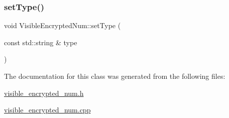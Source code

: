 \mbox{\label{class_visible_encrypted_num_abca1e8c379a3eba175937c7152ba298e}} 
\subsubsection{\texorpdfstring{set\+Type()}{setType()}}
{\footnotesize\ttfamily void Visible\+Encrypted\+Num\+::set\+Type (\begin{DoxyParamCaption}\item[{const std\+::string \&}]{type }\end{DoxyParamCaption})\hspace{0.3cm}{\ttfamily [virtual]}}



The documentation for this class was generated from the following files\+:\begin{DoxyCompactItemize}
\item 
\mbox{\hyperlink{visible__encrypted__num_8h}{visible\+\_\+encrypted\+\_\+num.\+h}}\item 
\mbox{\hyperlink{visible__encrypted__num_8cpp}{visible\+\_\+encrypted\+\_\+num.\+cpp}}\end{DoxyCompactItemize}
